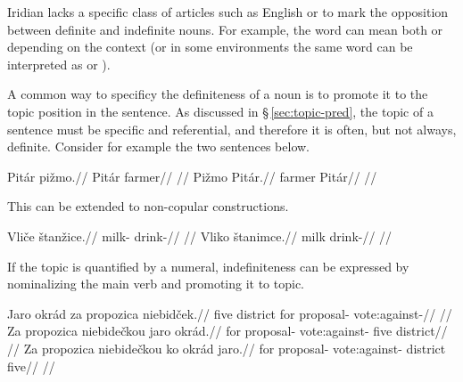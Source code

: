 Iridian lacks a specific class of articles such as English
 or  to mark the opposition between definite and indefinite
nouns. For example, the word  can mean both  or  depending on the context (or in some environments the same word can be
interpreted as   or ).

A common way to specificy the definiteness of a noun is to promote it to the
topic position in the sentence. As discussed in \S\,\ref{sec:topic-pred}, the
topic of a sentence must be specific and referential, and therefore it is often,
but not always, definite. Consider for example the two sentences below.

\begin{multicols}{2}
  \pex
  \a
  \begingl
  \gla Pit\'ar pi\v{z}mo.//
  \glb Pit\'ar farmer//
  \glft {}//
  \endgl
  \a
  \begingl
  \gla Pi\v{z}mo Pit\'ar.//
  \glb farmer Pit\'ar//
  \glft {}//
  \endgl
  \xe
\end{multicols}

This can be extended to non-copular constructions.

\begin{multicols}{2}
  \pex
  \a
  \begingl
  \gla Vli\v{c}e \v{s}tan\v{z}ice.//
  \glb milk- drink-//
  \glft {}//
  \endgl
  \a
  \begingl
  \gla Vliko \v{s}tanimce.//
  \glb milk drink-//
  \glft {}//
  \endgl
  \xe
\end{multicols}

If the topic is quantified by a numeral, indefiniteness can be expressed by nominalizing the main verb and promoting it to topic.

\pex
\a
\begingl
\gla Jaro okr\'ad za propozica niebid\v{c}ek.//
\glb five district for proposal- vote:against-//
\glft {}//
\endgl
\a
\begingl
\gla Za propozica niebide\v{c}kou jaro okr\'ad.//
\glb for proposal- vote:against- five district//
\glft {}//
\endgl
\a
\begingl
\gla Za propozica niebide\v{c}kou ko okr\'ad jaro.//
\glb for proposal- vote:against-  district five//
\glft {}//
\endgl
\xe

